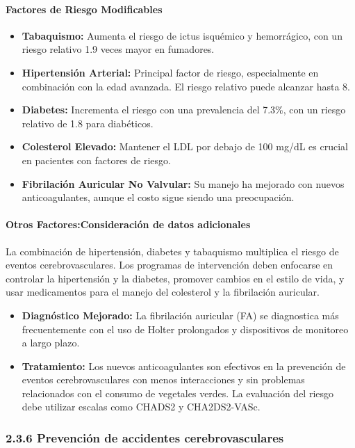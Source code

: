 \paragraph{Factores de Riesgo Modificables}
\begin{itemize}
    \item \textbf{Tabaquismo: } Aumenta el riesgo de ictus isquémico y hemorrágico, con un riesgo relativo 1.9 veces mayor en fumadores.
    \item \textbf{Hipertensión Arterial: } Principal factor de riesgo, especialmente en combinación con la edad avanzada. El riesgo relativo puede alcanzar hasta 8.
    \item \textbf{Diabetes: } Incrementa el riesgo con una prevalencia del 7.3\%, con un riesgo relativo de 1.8 para diabéticos.
    \item \textbf{Colesterol Elevado: } Mantener el LDL por debajo de 100 mg/dL es crucial en pacientes con factores de riesgo.
    \item \textbf{Fibrilación Auricular No Valvular: } Su manejo ha mejorado con nuevos anticoagulantes, aunque el costo sigue siendo una preocupación.
\end{itemize}

\paragraph{Otros Factores:Consideración de datos adicionales}
\newline
La combinación de hipertensión, diabetes y tabaquismo multiplica el riesgo de eventos cerebrovasculares. Los programas de intervención deben enfocarse en controlar la hipertensión y la diabetes, promover cambios en el estilo de vida, y usar medicamentos para el manejo del colesterol y la fibrilación auricular.

\begin{itemize}
    \item \textbf{Diagnóstico Mejorado: } La fibrilación auricular (FA) se diagnostica más frecuentemente con el uso de Holter prolongados y dispositivos de monitoreo a largo plazo.
    \item \textbf{Tratamiento: } Los nuevos anticoagulantes son efectivos en la prevención de eventos cerebrovasculares con menos interacciones y sin problemas relacionados con el consumo de vegetales verdes. La evaluación del riesgo debe utilizar escalas como CHADS2 y CHA2DS2-VASc.
\end{itemize}


\subsubsection{2.3.6 Prevención de accidentes cerebrovasculares}


